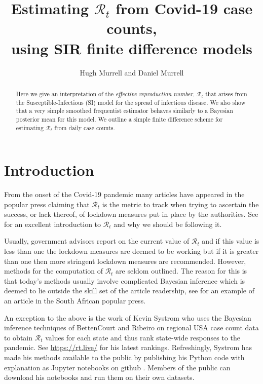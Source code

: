 \documentclass[11pt]{article}
\begin{document}
\title{Estimating $\mathcal{R}_t$ from Covid-19 case counts, \\
using SIR finite difference models }
\author{ Hugh Murrell and Daniel Murrell}
\maketitle

\begin{abstract}
\noindent Here we give an interpretation of
the {\it effective reproduction number}, $\mathcal{R}_t$ that arises
from the Susceptible-Infectious (SI) model 
for the spread of infectious disease. We also show that
a very simple smoothed frequentist estimator behaves 
similarly to a Bayesian posterior mean for this model.
We outline a simple  finite difference scheme for
estimating $\mathcal{R}_t$ from daily case counts.
\end{abstract}

\section{Introduction}

From the onset of the Covid-19 pandemic many articles have appeared
in the popular press claiming that $\mathcal{R}_t$ is the metric to track when trying
to ascertain the success, or lack thereof, of lockdown measures put in place
by the authorities. See \cite{groundup} for an excellent introduction to 
$\mathcal{R}_t$ and why we should be following it. 

Usually, government advisors report on the current value of $\mathcal{R}_t$
and if this value is less than one the lockdown measures are deemed to be working
but if it is greater than one then more stringent lockdown measures are recommended.
However, methods for the computation of $\mathcal{R}_t$ are seldom outlined.
The reason for this is that today's methods usually involve complicated
Bayesian inference which is deemed to lie outside the skill set of the article 
readership, see \cite{news24} for an example of an article in the South African
popular press.

An exception to the above is the work of Kevin Systrom who uses the 
Bayesian inference techniques of BettenCourt and Ribeiro \cite{bettencourt}
on regional USA case count data to obtain $\mathcal{R}_t$
values for each state and thus rank state-wide responses to the pandemic. See
\href{https://rt.live/}{https://rt.live/} for his latest rankings. 
Refreshingly, Systrom has made his methods available to the public by publishing 
his Python code with explanation as Jupyter notebooks on github \cite{systrom}.
Members of the public can download his notebooks and run them on their
own datasets.
\end{document}
